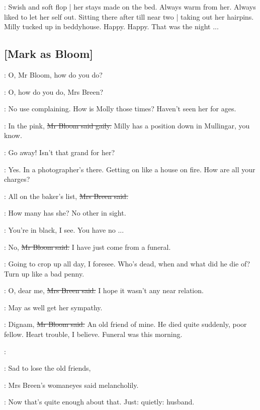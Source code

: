 \BloomInt:
Swish and soft flop |
her stays made on the bed.
Always warm from her.
Always liked to let her self out.
Sitting there after till near two |
taking out her hairpins.
Milly tucked up in beddyhouse.
Happy.
Happy.
That was the night ...

\subsection{[Mark as Bloom]}

\josie:
O, Mr Bloom, how do you do?

\Bloom:
O, how do you do, Mrs Breen?

\josie:
No use complaining.
How is Molly those times?
Haven't seen her for ages.

\Bloom:
In the pink,
\sout{Mr Bloom said gaily.}
Milly has a position down in Mullingar, you know.

\josie:
Go away!
Isn't that grand for her?

\Bloom:
Yes.
In a photographer's there.
Getting on like a house on fire.
How are all your charges?%

\josie:
All on the baker's list,
\sout{Mrs Breen said.}

\BloomInt:
How many has she?
No other in sight.

\josie:
You're in black, I see.
You have no ...

\Bloom:
No,
\sout{Mr Bloom said.}
I have just come from a funeral.

\BloomInt:
Going to crop up all day, I foresee.
Who's dead,
when and what did he die of?
Turn up like a bad penny.

\josie:
O, dear me,
\sout{Mrs Breen said.}
I hope it wasn't any near relation.

\BloomInt:
May as well get her sympathy.

\Bloom:
Dignam,
\sout{Mr Bloom said.}
An old friend of mine.
He died quite suddenly,
poor fellow.
Heart trouble, I believe.
Funeral was this morning.

\BloomInt:

\josie:
Sad to lose the old friends,

:
Mrs Breen's womaneyes said melancholily.

\BloomInt:
Now that's quite enough about that.
Just:
quietly:
husband.

